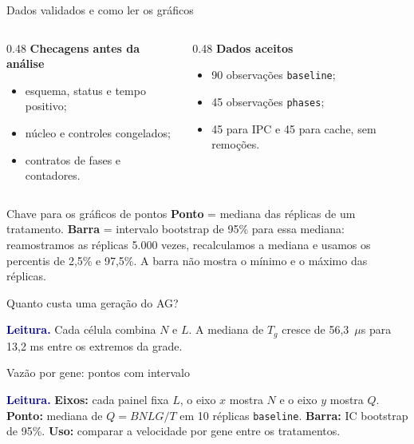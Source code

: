 \documentclass[aspectratio=169,11pt]{beamer}
\newcommand{\chartimage}[2][]{%
    \begin{center}\end{center}%
}
\newcommand{\chartcaption}[1]{%
    \vspace{-0.16cm}\par\footnotesize\textcolor{darkblue}{\textbf{Leitura.}} #1\par%
}
\begin{document}
\begin{frame}{Dados validados e como ler os gráficos}
    \begin{columns}[T,onlytextwidth]
        \begin{column}{0.48\textwidth}
            \textbf{Checagens antes da análise}
            \begin{itemize}
                \item esquema, status e tempo positivo;
                \item núcleo e controles congelados;
                \item contratos de fases e contadores.
            \end{itemize}
        \end{column}
        \begin{column}{0.48\textwidth}
            \textbf{Dados aceitos}
            \begin{itemize}
                \item 90 observações \texttt{baseline};
                \item 45 observações \texttt{phases};
                \item 45 para IPC e 45 para cache, sem remoções.
            \end{itemize}
        \end{column}
    \end{columns}
    \vspace{0.16cm}
    \begin{questionbox}{Chave para os gráficos de pontos}
        \textbf{Ponto} = mediana das réplicas de um tratamento. \textbf{Barra} = intervalo bootstrap
        de 95\% para essa mediana: reamostramos as réplicas 5.000 vezes, recalculamos a mediana e
        usamos os percentis de 2,5\% e 97,5\%. A barra não mostra o mínimo e o máximo das réplicas.
    \end{questionbox}
\end{frame}

\begin{frame}{Quanto custa uma geração do AG?}
    \chartimage{../figures/tempo-geracao-heatmap}
    \chartcaption{Cada célula combina $N$ e $L$. A mediana de $T_g$ cresce de 56,3~$\mu$s para
    13,2 ms entre os extremos da grade.}
\end{frame}

\begin{frame}{Vazão por gene: pontos com intervalo}
    \chartimage{../figures/vazao-workset}
    \chartcaption{\textbf{Eixos:} cada painel fixa $L$, o eixo $x$ mostra $N$ e o eixo $y$ mostra $Q$.
    \textbf{Ponto:} mediana de $Q=BNLG/T$ em 10 réplicas \texttt{baseline}. \textbf{Barra:} IC bootstrap
    de 95\%. \textbf{Uso:} comparar a velocidade por gene entre os tratamentos.}
\end{frame}
\end{document}
